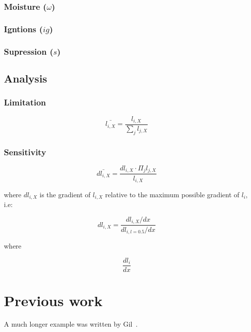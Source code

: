 \documentclass[12pt]{article}
\begin{document}
\subsubsection{Moisture ($\omega$)}

\subsubsection{Igntions ($ig$)}

\subsubsection{Supression ($s$)}

\subsection{Analysis}

\subsubsection{Limitation}

\begin{equation}
    \bar{l_{i, X}} = \frac{l_{i, X}}{\sum_{j} l_{j, X}}
\end{equation}

\subsubsection{Sensitivity}

\begin{equation}
    \bar{dl_{i, X}} = \frac{dl_{i, X} \cdot \Pi_{j} l_{j, X}}{l_{i, X}}
\end{equation}

where $dl_{i, X}$ is the gradient of $l_{i, X}$ relative to the maximum possible gradient of $l_{i}$, i.e:

\begin{equation}
    dl_{i, X} = \frac{dl_{i, X} / dx}{dl_{i, l = 0.5} / dx}
\end{equation}

where

\begin{equation}
    \frac{dl_{i}}{dx} 
\end{equation}

\section{Previous work}\label{previous work}
A much longer \LaTeXe{} example was written by Gil~\cite{Gil:02}.
\end{document}
